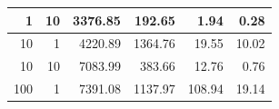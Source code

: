 \documentclass[12pt,a4paper]{report}
\begin{document}
\begin{table}[H]
\begin{tabular}{|r|r|r|r|r|r|}
1                                                                                               & 10                                                                                                                      & 3376.85                                                                                                                                    & 192.65                                                                                                                               & 1.94                                                                                                  & 0.28                                                                                                                               \\ \hline
10                                                                                              & 1                                                                                                                       & 4220.89                                                                                                                                    & 1364.76                                                                                                                              & 19.55                                                                                                 & 10.02                                                                                                                              \\ \hline
10                                                                                              & 10                                                                                                                      & 7083.99                                                                                                                                    & 383.66                                                                                                                               & 12.76                                                                                                 & 0.76                                                                                                                               \\ \hline
100                                                                                             & 1                                                                                                                       & 7391.08                                                                                                                                    & 1137.97                                                                                                                              & 108.94                                                                                                & 19.14                                                                                                                              \\ \hline

\end{tabular}
\end{table}
\end{document}
